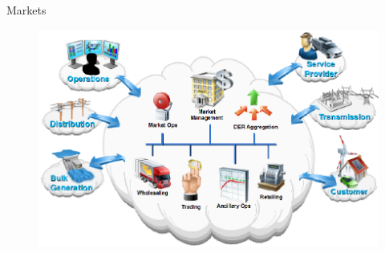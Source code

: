 
\begin{frame}[fragile]{Markets}
	\begin{figure}[h] 
		\includegraphics[scale=0.45]{imgs/market.png}
	\end{figure}
\end{frame}




